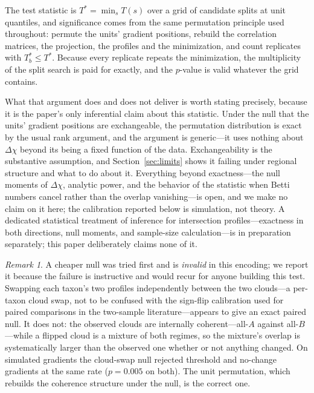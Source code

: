 \documentclass[review,12pt,authoryear]{elsarticle}
\theoremstyle{remark}
\newtheorem{remark}{Remark}
\begin{document}
The test statistic is $T^\ast = \min_s T(s)$ over a grid of candidate splits
at unit quantiles, and significance comes from the same permutation
principle used throughout: permute the units' gradient positions, rebuild the
correlation matrices, the projection, the profiles and the minimization, and
count replicates with $T^\ast_b \le T^\ast$. Because every replicate repeats
the minimization, the multiplicity of the split search is paid for exactly,
and the $p$-value is valid whatever the grid contains.

What that argument does and does not deliver is worth stating precisely,
because it is the paper's only inferential claim about this statistic. Under
the null that the units' gradient positions are exchangeable, the
permutation distribution is exact by the usual rank argument, and the
argument is generic---it uses nothing about $\Delta\chi$ beyond its being a
fixed function of the data. Exchangeability is the substantive assumption,
and Section~\ref{sec:limits} shows it failing under regional structure and
what to do about it. Everything beyond exactness---the null moments of
$\Delta\chi$, analytic power, and the behavior of the statistic when Betti
numbers cancel rather than the overlap vanishing---is open, and we make no
claim on it here; the calibration reported below is simulation, not theory.
A dedicated statistical treatment of inference for intersection profiles---exactness in both directions, null moments, and sample-size calculation---is
in preparation separately; this paper deliberately claims none of it.

\begin{remark}
A cheaper null was tried first and is \emph{invalid} in this encoding; we report it because
the failure is instructive and would recur for anyone building this test.
Swapping each taxon's two profiles independently between the two clouds---a
per-taxon cloud swap, not to be confused with the sign-flip calibration used
for paired comparisons in the two-sample literature---appears to give an
exact paired null. It does not: the observed clouds are
internally coherent---all-$A$ against all-$B$---while a flipped cloud is a
mixture of both regimes, so the mixture's overlap is systematically larger
than the observed one whether or not anything changed. On simulated
gradients the cloud-swap null rejected threshold and no-change gradients at
the same rate ($p = 0.005$ on both). The unit permutation, which rebuilds
the coherence structure under the null, is the correct one.
\end{remark}
\end{document}
